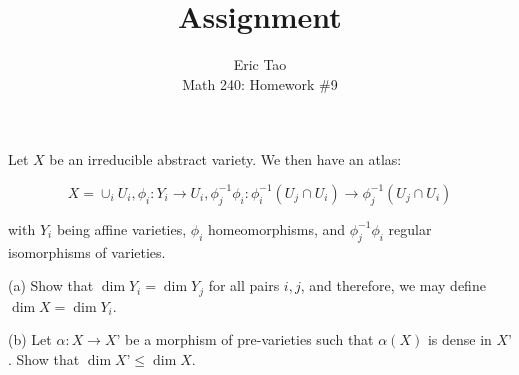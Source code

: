 \documentclass[10pt]{article}
\newenvironment{problem}[2][Problem]{\begin{trivlist}
\item[\hskip \labelsep {\bfseries #1}\hskip \labelsep {\bfseries #2.}]}{\end{trivlist}}
\begin{document}
 
\title{Assignment}
\author{Eric Tao\\
Math 240: Homework \#9}
\maketitle
 
\begin{problem}{9.1}

Let $X$ be an irreducible abstract variety. We then have an atlas:

$$ X = \cup_i U_i, \phi_i: Y_i \to U_i, \phi_j^{-1} \phi_i: \phi_i^{-1}(U_j \cap U_i) \to \phi^{-1}_j (U_j \cap U_i) $$

with $Y_i$ being affine varieties, $\phi_i$ homeomorphisms, and $\phi_j^{-1}\phi_i$ regular isomorphisms of varieties.

(a) Show that $\dim Y_i = \dim Y_j$ for all pairs $i,j$, and therefore, we may define $\dim X = \dim Y_i$.

(b) Let $\alpha: X \to X’$ be a morphism of pre-varieties such that $\alpha(X)$ is dense in $X’$. Show that $\dim X’ \leq \dim X$. 

\end{problem}
\end{document}
